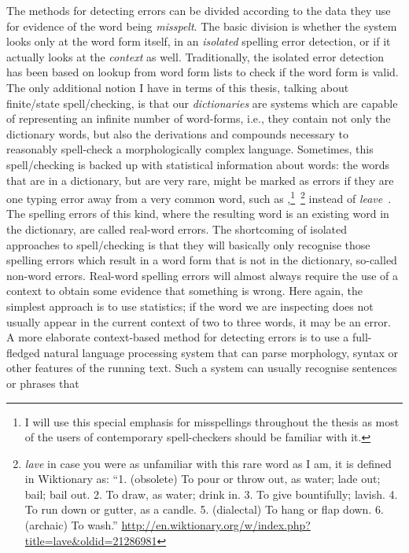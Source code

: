 \documentclass[officiallayout,final]{unihelcompling}
\newcommand\misspelt{\bgroup\markoverwith
{\textcolor{red}{\lower3.5pt\hbox{\sixly \char58}}}\ULon}
\begin{document}
The methods for detecting errors can be divided according to the data they use
for evidence of the word being \emph{misspelt}. The basic division is whether the
system looks only at the \gls{word form} itself, in an \emph{isolated} spelling
error detection, or if it actually looks at the \emph{context} as well.
Traditionally, the isolated error detection has been based on lookup from
word form lists to check if the word form is valid. The only additional notion
I have in terms of this thesis, talking about finite\-/state spell\-/checking,
is that our \emph{dictionaries} are systems which are capable of representing an infinite
number of word-forms, i.e., they contain not only the dictionary words, but
also the derivations and compounds necessary to reasonably spell-check a
morphologically complex language. Sometimes, this spell\-/checking is backed up
with statistical information about words: the words that are in a dictionary,
but are very rare, might be marked as errors if they are one typing error away
from a very common word, such as \misspelt{lave},\footnote{I will use this
    special emphasis for misspellings throughout the thesis as most of the
    users of contemporary spell-checkers should be familiar with
it.}~\footnote{\emph{lave} in case you were as unfamiliar with this rare word
    as I am, it is defined in Wiktionary as: ``1. (obsolete) To pour or throw
    out, as water; lade out; bail; bail out. 2. To draw, as water; drink in. 3.
To give bountifully; lavish. 4. To run down or gutter, as a candle. 5.
(dialectal) To hang or flap down. 6. (archaic) To wash.''
\url{http://en.wiktionary.org/w/index.php?title=lave&oldid=21286981}} instead
of \emph{leave}~\citep{kukich1992techniques}.  The spelling errors of this
kind, where the resulting word is an existing word in the dictionary, are
called \glspl{real-word error}.  The shortcoming of isolated approaches
to spell\-/checking is that they will basically only recognise those spelling
errors which result in a word form that is not in the dictionary,
so-called \glspl{non-word error}. Real-word spelling errors
will almost always require the use of a context to obtain some evidence that
something is wrong. Here again, the simplest approach is to use statistics; if
the word we are inspecting does not usually appear in the current context of
two to three words, it may be an error. A more elaborate context-based
method for detecting errors is to use a full-fledged natural language
processing system that can parse morphology, syntax or other features of the
running text.  Such a system can usually recognise sentences or phrases that
\end{document}
